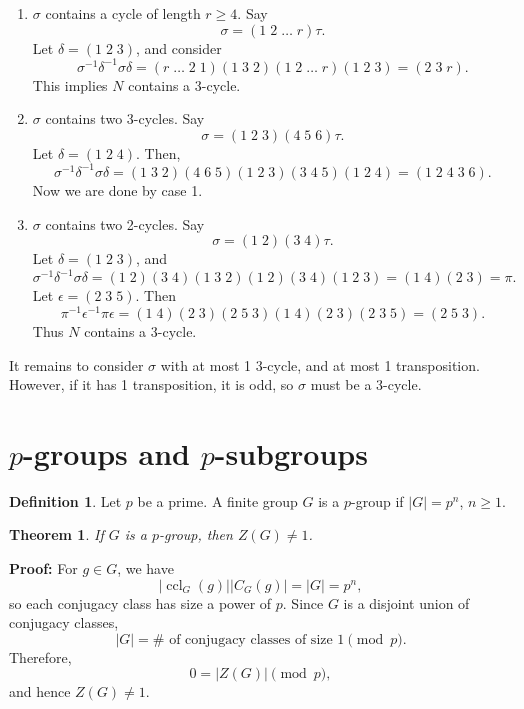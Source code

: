\documentclass[12pt]{article}
\DeclareMathOperator{\ccl}{ccl}
\newtheorem{theorem}{Theorem}[section]
\theoremstyle{definition}
\newtheorem{definition}{Definition}[section]
\theoremstyle{remark}
\begin{document}
\begin{enumerate}[label = Case \arabic*:]
	\item $\sigma$ contains a cycle of length $r \geq 4$. Say 
		\[
			\sigma = (1\; 2\; \ldots\; r) \tau
		.\]
		Let $\delta = (1\; 2\; 3)$, and consider
		\[
			\sigma^{-1} \delta^{-1} \sigma \delta = (r\; \ldots\; 2\; 1)(1\; 3\; 2)(1\; 2\; \ldots\; r)(1\; 2\; 3) = (2\; 3\; r)
		.\]
		This implies $N$ contains a 3-cycle.
	\item $\sigma$ contains two 3-cycles.  Say
		\[
			\sigma = (1\; 2\; 3)(4\; 5\; 6) \tau
		.\]
		Let $\delta = (1\; 2\; 4)$. Then,
		\[
			\sigma^{-1} \delta^{-1} \sigma \delta = (1\; 3\; 2)(4\; 6\; 5)(1\; 2\; 3)(3\; 4\; 5)(1\; 2\; 4) = (1\; 2\; 4\; 3\; 6)
		.\]
		Now we are done by case 1.
	\item $\sigma$ contains two 2-cycles. Say
		\[
			\sigma = (1\; 2)(3\; 4)\tau
		.\]
		Let $\delta = (1\; 2\; 3)$, and
		\[
			\sigma^{-1} \delta^{-1} \sigma \delta = (1\; 2)(3\; 4)(1\; 3\; 2)(1\; 2)(3\; 4)(1\; 2\; 3) = (1\; 4)(2\; 3) = \pi
		.\]
		Let $\epsilon = (2\; 3\; 5)$. Then
		\[
			\pi^{-1} \epsilon^{-1} \pi \epsilon = (1\; 4)(2\; 3)(2\; 5\; 3)(1\; 4)(2\; 3)(2\; 3\; 5) = (2\; 5\; 3)
		.\]
		Thus $N$ contains a 3-cycle.
\end{enumerate}
It remains to consider $\sigma$ with at most 1 3-cycle, and at most 1 transposition. However, if it has 1 transposition, it is odd, so $\sigma$ must be a 3-cycle.

\newpage

\section{\texorpdfstring{$p$}{p}-groups and \texorpdfstring{$p$}{p}-subgroups}%
\label{sec:_p_groups_and_p_subgroups}

\begin{definition}
	Let $p$ be a prime. A finite group $G$ is a $p$-group if $|G| = p^{n}$, $n \geq 1$.
\end{definition}

\begin{theorem}
	If $G$ is a $p$-group, then $Z(G) \neq 1$.
\end{theorem}

\begin{adjustbox}{minipage = \columnwidth - 25.5pt, margin=1em, frame=1pt, margin=0em}
\textbf{Proof:} For $g \in G$, we have
\[
	|\!\ccl_G(g)||C_G(g)| = |G| = p^{n}
,\]
so each conjugacy class has size a power of $p$. Since $G$ is a disjoint union of conjugacy classes,
\[
	|G| = \# \text{ of conjugacy classes of size 1} \pmod p
.\]
Therefore,
\[
	0 = |Z(G)| \pmod p
,\]
and hence $Z(G) \neq 1$.

\end{adjustbox}
\end{document}
